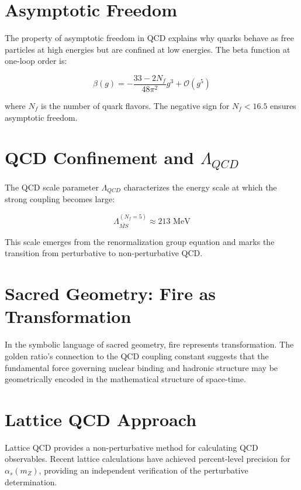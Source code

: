 \section{Asymptotic Freedom}

The property of asymptotic freedom in QCD explains why quarks behave as free particles at high energies but are confined at low energies. The beta function at one-loop order is:

\begin{equation}
\beta(g) = -\frac{33 - 2N_f}{48\pi^2} g^3 + \mathcal{O}(g^5)
\end{equation}

where $N_f$ is the number of quark flavors. The negative sign for $N_f < 16.5$ ensures asymptotic freedom.

\section{QCD Confinement and $\Lambda_{QCD}$}

The QCD scale parameter $\Lambda_{QCD}$ characterizes the energy scale at which the strong coupling becomes large:

\begin{equation}
\Lambda_{\overline{MS}}^{(N_f=5)} \approx 213 \text{ MeV}
\end{equation}

This scale emerges from the renormalization group equation and marks the transition from perturbative to non-perturbative QCD.

\section{Sacred Geometry: Fire as Transformation}

In the symbolic language of sacred geometry, fire represents transformation. The golden ratio's connection to the QCD coupling constant suggests that the fundamental force governing nuclear binding and hadronic structure may be geometrically encoded in the mathematical structure of space-time.

\section{Lattice QCD Approach}

Lattice QCD provides a non-perturbative method for calculating QCD observables. Recent lattice calculations have achieved percent-level precision for $\alpha_s(m_Z)$, providing an independent verification of the perturbative determination.

